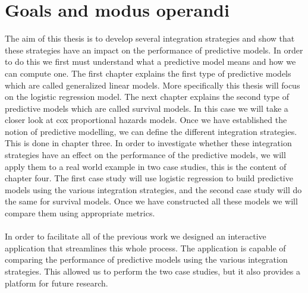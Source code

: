 \section{Goals and modus operandi}
The aim of this thesis is to develop several integration strategies and show that these strategies have an impact on the performance of predictive models. In order to do this we first must understand what a predictive model means and how we can compute one. The first chapter explains the first type of predictive models which are called generalized linear models. More specifically this thesis will focus on the logistic regression model. The next chapter explains the second type of predictive models which are called survival models. In this case we will take a closer look at cox proportional hazards models. Once we have established the notion of predictive modelling, we can define the different integration strategies. This is done in chapter three. In order to investigate whether these integration strategies have an effect on the performance of the predictive models, we will apply them to a real world example in two case studies, this is the content of chapter four. The first case study will use logistic regression to build predictive models using the various integration strategies, and the second case study will do the same for survival models. Once we have constructed all these models we will compare them using appropriate metrics. \\ \\
In order to facilitate all of the previous work we designed an interactive application that streamlines this whole process. The application is capable of comparing the performance of predictive models using the various integration strategies. This allowed us to perform the two case studies, but it also provides a platform for future research. 
